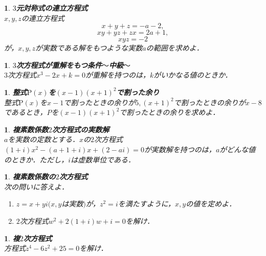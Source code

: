 \documentclass[10pt,
fleqn,
dvipdfmx,
uplatex
]{jsarticle}
\newtheorem{question}[Question]{}
\begin{document}
\begin{question}{\bf\boldmath $3$元対称式の連立方程式}\\
$x, y, z$の連立方程式
\[x+y+z=-a-2, \]
\[xy+yz+zx=2a+1, \]
\[xyz=-2\]
が，$x,y,z$が実数である解をもつような実数$a$の範囲を求めよ．
\end{question}



\begin{question}{\bf\boldmath $3$次方程式が重解をもつ条件$〜$中級$〜$}\\
$3$次方程式$x^3-2x+k=0$が重解を持つのは，$k$がいかなる値のときか．
\end{question}



\begin{question}{\bf\boldmath 整式$\text{P}\left(x\right)$を$\left(x-1\right)\left(x+1\right)^2$で割った余り}\\
整式$\text{P}\left(x\right)$を$x-1$で割ったときの余りが$5, \left(x+1\right)^2$で割ったときの余りが$x-8$であるとき，$P$を$\left(x-1\right)\left(x+1\right)^2$で割ったときの余りを求めよ．
\end{question}



\begin{question}{\bf\boldmath 複素数係数$2$次方程式の実数解}\\
$a$を実数の定数とする．$x$の$2$次方程式$\left(1+i\right)x^2-\left(a+1+i\right)x+\left(2-ai\right)=0$が実数解を持つのは，$a$がどんな値のときか．ただし，$i$は虚数単位である．
\end{question}



\begin{question}{\bf\boldmath 複素数係数の$2$次方程式}\\
次の問いに答えよ．
\begin{enumerate}
\item $z=x+yi(x, y$は実数$)$が，$z^2=i$を満たすように，$x, y$の値を定めよ．
\item $2$次方程式$w^2+2\left(1+i\right)w+i=0$を解け．
\end{enumerate}

\end{question}



\begin{question}{\bf\boldmath 複$2$次方程式}\\
方程式$z^4-6z^2+{25}=0$を解け．
\end{question}
\end{document}
